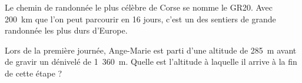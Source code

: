 
Le chemin de randonnée le plus célèbre de Corse se nomme le GR20. Avec 200~km que l'on peut parcourir en 16 jours, c'est un des sentiers de grande randonnée les plus durs d'Europe.

Lors de la première journée, Ange-Marie est parti d'une altitude de 285~m avant de gravir un dénivelé de 1~360~m. Quelle est l'altitude à laquelle il arrive à la fin de cette étape ?